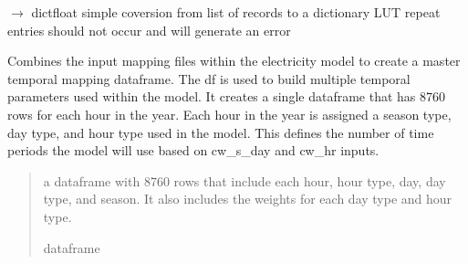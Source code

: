 \documentclass[letterpaper,10pt,english]{sphinxmanual}
\begin{document}
\begin{fulllineitems}
\label{\detokenize{src.integrator.utilities:src.integrator.utilities.convert_h2_price_records}}
\pysigstartsignatures
\pysiglinewithargsret
{}
{}
{{ $\rightarrow$ dict\DUrole{p}{{[}}{\hyperref[\detokenize{src.integrator.utilities:src.integrator.utilities.HI}]{\sphinxcrossref{HI}}}float\DUrole{p}{{]}}}}
\pysigstopsignatures
\sphinxAtStartPar
simple coversion from list of records to a dictionary LUT
repeat entries should not occur and will generate an error

\end{fulllineitems}


\begin{fulllineitems}
\label{\detokenize{src.integrator.utilities:src.integrator.utilities.create_temporal_mapping}}
\pysigstartsignatures
\pysiglinewithargsret
{}
{}
{}
\pysigstopsignatures
\sphinxAtStartPar
Combines the input mapping files within the electricity model to create a master temporal
mapping dataframe. The df is used to build multiple temporal parameters used within the  model.
It creates a single dataframe that has 8760 rows for each hour in the year.
Each hour in the year is assigned a season type, day type, and hour type used in the model.
This defines the number of time periods the model will use based on cw\_s\_day and cw\_hr inputs.
\begin{quote}\begin{description}
\sphinxAtStartPar
a dataframe with 8760 rows that include each hour, hour type, day, day type, and season.
It also includes the weights for each day type and hour type.

\sphinxAtStartPar
dataframe

\end{description}\end{quote}

\end{fulllineitems}
\end{document}
